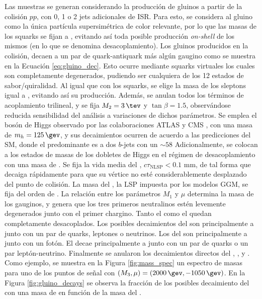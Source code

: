 Las muestras se generan considerando la producción de gluinos a partir de la colisión $pp$, con 0, 1 o 2 jets adicionales de ISR. Para esto, se considera al gluino como la única partícula supersimétrica de color relevante, por lo que las masas de los squarks se fijan a , evitando así toda posible producción \textit{on-shell} de los mismos (en lo que se denomina desacoplamiento). Los gluinos producidos en la colisión, decaen a un par de quark-antiquark más algún gaugino como se muestra en la Ecuación \ref{eq:gluino_dec}. Esto ocurre mediante squarks virtuales los cuales son completamente degenerados, pudiendo ser cualquiera de los 12 estados de sabor/quiralidad.
Al igual que con los squarks, se elige la masa de los sleptons igual a , evitando así su producción.
Además, se anulan todos los términos de acoplamiento trilineal, y se fija $M_2=3\,\tev$ y $\tan{\beta}=1.5$, observándose reducida sensibilidad del análisis a variaciones de dichos parámetros. Se emplea el bosón de Higgs observado por las colaboraciones ATLAS y CMS \cite{higgs_mass}, con una masa de $m_h=125\,\gev$, y sus decaimientos ocurren de acuerdo a las predicciones del SM, 
donde el predominante es a dos $b$-jets con un $\sim58$
Adicionalmente, se colocan a los estados de masas de los dobletes de Higgs en el régimen de desacoplamiento con una masa de .
Se fija la vida media del \ninoone, $c\tau_{\text{NLSP}}<0.1$ mm, de tal forma que decaiga rápidamente para que su vértice no esté considerablemente desplazado del punto de colisión. 
La masa del \gravino, la LSP impuesta por los modelos GGM, se fija del orden de .
La relación entre los parámetros $M_1$ y $\mu$ determina la masa de los gauginos, y genera que los tres primeros neutralinos estén levemente degenerados junto con el primer chargino. Tanto el \ninofour como el \chinotwopm quedan completamente desacoplados. Los posibles decaimientos del \ninotwo son principalmente a \ninoone junto con un par de quarks, leptones o neutrinos. Los del \ninothree son principalmente a \ninoone junto con un fotón. El \chinoonepm decae principalmente a \ninoone junto con un par de quarks o un par leptón-neutrino. Finalmente se anularon los decaimientos directos del \gluino, \ninotwo, \ninothree y \chinoonepm. Como ejemplo, se muestra en la Figura \ref{fig:mass_spec} un espectro de masas para uno de los puntos de señal con $(M_3, \mu) = (2000\,\gev, -1050\,\gev)$. En la Figura \ref{fig:gluino_decays} se observa la fracción de los posibles decaimiento del \gluino con una masa de  en función de la masa del \ninoone. 





